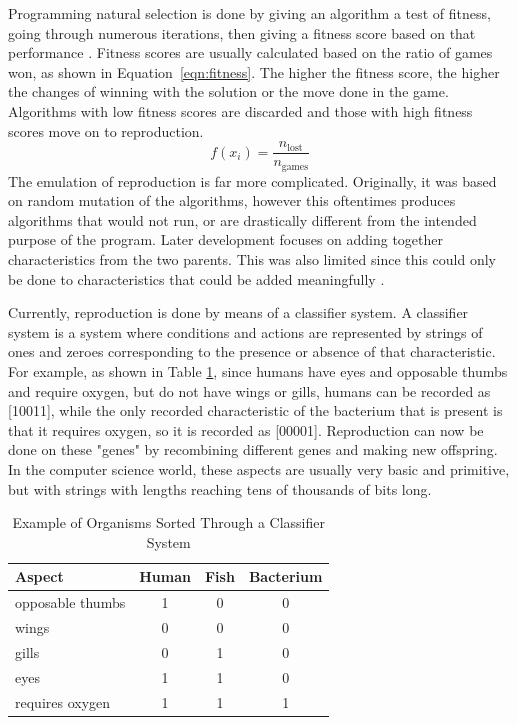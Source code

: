 \documentclass{strrespaper-trad}
\begin{document}
			Programming natural selection is done by giving an algorithm a test of fitness, going through numerous iterations, then giving a fitness score based on that performance \autocite{hochmuthGeneticEvolutionPerfect2003}.
			Fitness scores are usually calculated based on the ratio of games won, as shown in Equation~\ref{eqn:fitness}.
			The higher the fitness score, the higher the changes of winning with the solution or the move done in the game.
			Algorithms with low fitness scores are discarded and those with high fitness scores move on to reproduction.
			\begin{equation}
				f(x_i) = \frac{n_\mathrm{lost}}{n_\mathrm{games}} \label{eqn:fitness}
			\end{equation}
			The emulation of reproduction is far more complicated.
			Originally, it was based on random mutation of the algorithms, however this oftentimes produces algorithms that would not run, or are drastically different from the intended purpose of the program.
			Later development focuses on adding together characteristics from the two parents.
			This was also limited since this could only be done to characteristics that could be added meaningfully \autocite{hollandGeneticAlgorithms}.

			Currently, reproduction is done by means of a classifier system.
			A classifier system is a system where conditions and actions are represented by strings of ones and zeroes corresponding to the presence or absence of that characteristic.
			For example, as shown in Table \ref{tab:ex_classifier}, since humans have eyes and opposable thumbs and require oxygen, but do not have wings or gills, humans can be recorded as [10011], while the only recorded characteristic of the bacterium that is present is that it requires oxygen, so it is recorded as [00001].
			Reproduction can now be done on these "genes" by recombining different genes and making new offspring.
			In the computer science world, these aspects are usually very basic and primitive, but with strings with lengths reaching tens of thousands of bits long.

			\begin{table}[htbp]
				\centering
				\begin{tabular}{lccc}
					\toprule
					Aspect           & Human & Fish & Bacterium \\
					\midrule
					opposable thumbs & 1     & 0    & 0         \\
					wings            & 0     & 0    & 0         \\
					gills            & 0     & 1    & 0         \\
					eyes             & 1     & 1    & 0         \\
					requires oxygen  & 1     & 1    & 1         \\
					\bottomrule
				\end{tabular}
				\caption{Example of Organisms Sorted Through a Classifier System}
				\label{tab:ex_classifier}
			\end{table}
\end{document}
